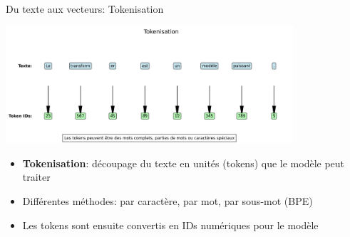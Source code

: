 \documentclass[aspectratio=169]{beamer}
\begin{document}
\begin{frame}{Du texte aux vecteurs: Tokenisation}
    \begin{center}
        \includegraphics[width=0.8\textwidth]{images/generated/tokenization_process.png}
    \end{center}
    \begin{itemize}
        \item \textbf{Tokenisation}: découpage du texte en unités (tokens) que le modèle peut traiter
        \item Différentes méthodes: par caractère, par mot, par sous-mot (BPE)
        \item Les tokens sont ensuite convertis en IDs numériques pour le modèle
    \end{itemize}
\end{frame}
\end{document}
